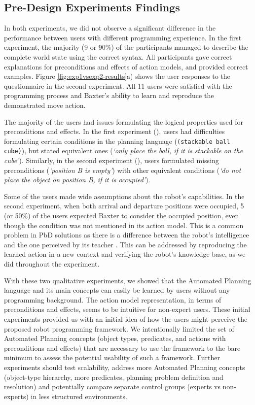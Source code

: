 \subsection{Pre-Design Experiments Findings}
In both experiments, we did not observe a significant difference in the performance between users with different programming experience. 
In the first experiment, the majority (9 or 90\%) of the participants managed to describe the complete world state using the correct syntax.
All participants gave correct explanations for preconditions and effects of action models, and provided correct examples.
Figure \ref{fig:exp1vsexp2-results}a) shows the user responses to the questionnaire in the second experiment.
All 11 users were satisfied with the programming process and Baxter's ability to learn and reproduce the demonstrated move action. 

The majority of the users had issues formulating the logical properties used for preconditions and effects. 
In the first experiment (), users had difficulties formulating certain conditions in the planning language (\eg \texttt{(stackable ball cube)}), but stated equivalent ones (\eg \textit{`only place the ball, if it is stackable on the cube'}).
Similarly, in the second experiment (), users formulated missing preconditions (\eg \textit{`position B is empty'}) with other equivalent conditions (\eg \textit{`do not place the object on position B, if it is occupied'}). 

Some of the users made wide assumptions about the robot's capabilities. 
In the second experiment, when both arrival and departure positions were occupied, 5 (or 50\%) of the users expected Baxter to consider the occupied position, even though the condition was not mentioned in its action model.
This is a common problem in PbD solutions as there is a difference between the robot's intelligence and the one perceived by its teacher \cite{suay2012practical}.
This can be addressed by reproducing the learned action in a new context and verifying the robot's knowledge base, as we did throughout the experiment.

With these two qualitative experiments, we showed that the Automated Planning language and its main concepts can easily be learned by users without any programming background. 
The action model representation, in terms of preconditions and effects, seems to be intuitive for non-expert users. 
These initial experiments provided us with an initial idea of how the users might perceive the proposed robot programming framework. 
We intentionally limited the set of Automated Planning concepts (\ie object types, predicates, and actions with preconditions and effects) that are necessary to use the framework to the bare minimum to assess the potential usability of such a framework. 
Further experiments should test scalability, address more Automated Planning concepts (\eg object-type hierarchy, more predicates, planning problem definition and resolution) and potentially compare separate control groups (\eg experts vs non-experts) in less structured environments.

